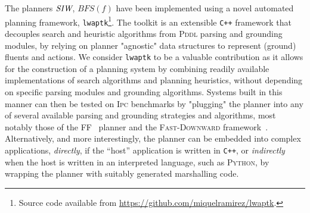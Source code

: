 The planners ${\textit{SIW}}$, $BFS(f)$ have been implemented using a novel
automated planning framework, \texttt{lwaptk}\footnote{Source code available from
\url{https://github.com/miquelramirez/lwaptk}.}. The toolkit is an extensible \texttt{C++}
framework that decouples search and heuristic algorithms from \textsc{Pddl} parsing and grounding modules, by relying
on planner "agnostic" data structures to represent (ground) fluents and actions.
We consider \texttt{lwaptk} to be a valuable contribution as it allows for the construction of a planning system by combining 
readily available implementations of search algorithms and planning heuristics, without
depending on specific parsing modules and grounding algorithms. Systems built in this manner
can then be tested on \textsc{Ipc} benchmarks by "plugging" the planner into any of several available 
parsing and grounding strategies and algorithms, most notably those of the \textsc{FF}~\cite{hoffmann:ff}
planner and the \textsc{Fast-Downward} framework~\cite{helmert:fd}. Alternatively, and more interestingly,
the planner can be embedded into complex applications, \emph{directly}, if the ``host'' application is written in 
\texttt{C++}, or \emph{indirectly} when the host is written in an interpreted language, such as \textsc{Python}, 
by wrapping the planner with suitably generated marshalling code. 

